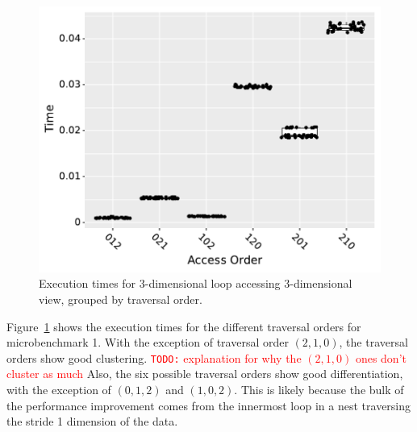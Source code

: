 \documentclass[sigconf, table]{acmart}
\newcommand{\todo}[1]{{\textcolor{red}{{\tt{TODO:}}\,\,#1 }}}
\begin{document}
\begin{figure}
  \includegraphics{benchmark1_boxplot.pdf}
  \caption{Execution times for 3-dimensional loop accessing 3-dimensional view, grouped by traversal order.}
  \label{TraversalBenchmark1}
\end{figure}
Figure~\ref{TraversalBenchmark1} shows the execution times for the different traversal orders for microbenchmark 1. 
With the exception of traversal order $(2,1,0)$, the traversal orders show good clustering.
\todo{explanation for why the $(2,1,0)$ ones don't cluster as much}
Also, the six possible traversal orders show good differentiation, with the exception of $(0,1,2)$ and $(1,0,2)$. 
This is likely because the bulk of the performance improvement comes from the innermost loop in a nest traversing the stride 1 dimension of the data.
\end{document}
